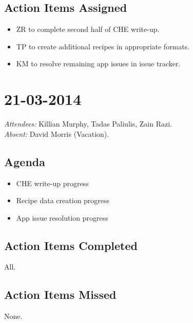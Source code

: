 \documentclass{article}
\begin{document}
\subsection*{Action Items Assigned}
\begin{itemize}
\item ZR to complete second half of CHE write-up.
\item TP to create additional recipes in appropriate formats.
\item KM to resolve remaining app issues in issue tracker.
\end{itemize}


\clearpage

\section*{21-03-2014}
\vspace{0.5cm}
\emph{Attendees: }Killian Murphy, Tadas Paliulis, Zain Razi.
\\
\emph{Absent: }David Morris (Vacation).

\subsection*{Agenda}
\begin{itemize}
\item CHE write-up progress
\item Recipe data creation progress
\item App issue resolution progress
\end{itemize}

\subsection*{Action Items Completed}
All.

\subsection*{Action Items Missed}
None.
\end{document}
